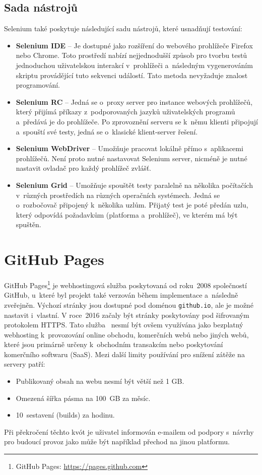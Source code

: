 \subsection*{Sada nástrojů}
Selenium také poskytuje následující sadu nástrojů, které usnadňují testování:
\begin{itemize}
    \item \textbf{Selenium IDE} -- Je dostupné jako rozšíření do webového prohlížeče Firefox nebo Chrome. Toto prostředí nabízí nejjednodušší způsob pro tvorbu testů jednoduchou uživatelskou interakcí v~prohlížeči a~následným vygenerováním skriptu provádějící tuto sekvenci událostí. Tato metoda nevyžaduje znalost programování.
    \item \textbf{Selenium RC} -- Jedná se o~proxy server pro instance webových prohlížečů, který přijímá příkazy z~podporovaných jazyků uživatelských programů a~předává je do prohlížeče. Po zprovoznění serveru se k~němu klienti připojují a~spouští své testy, jedná se o~klasické klient-server řešení.
    \item \textbf{Selenium WebDriver} -- Umožňuje pracovat lokálně přímo s~aplikacemi prohlížečů. Není proto nutné nastavovat Selenium server, nicméně je nutné nastavit ovladač pro každý prohlížeč zvlášť.
    \item \textbf{Selenium Grid} -- Umožňuje \cite{website:Selenium} spouštět testy paralelně na několika počítačích v~různých prostředích na různých operačních systémech. Jedná se o~rozbočovač připojený k~několika uzlům. Přijatý test je poté předán uzlu, který odpovídá požadavkům (platforma a~prohlížeč), ve kterém má být spuštěn.
\end{itemize}

\section{GitHub Pages}
\label{sec:GitHub Pages}
GitHub Pages\footnote{GitHub Pages: \url{https://pages.github.com}} je webhostingová služba poskytovaná od roku~2008 společností GitHub, u~které byl projekt také verzován během implementace a~následně zveřejněn. Výchozí stránky jsou dostupné pod doménou \texttt{github.io}, ale je možné nastavit i~vlastní. V roce~2016 začaly být stránky poskytovány pod šifrovaným protokolem HTTPS. Tato služba~\cite{website:ghpages} nesmí být ovšem využívána jako bezplatný webhosting k~provozování online obchodu, komerčních webů nebo jiných webů, které jsou primárně určeny k~obchodním transakcím nebo poskytování komerčního softwaru (SaaS). Mezi další limity používání pro snížení zátěže na servery patří:
\begin{itemize}
    \item Publikovaný obsah na webu nesmí být větší než 1 GB.
    \item Omezená šířka pásma na 100~GB za měsíc.
    \item 10~sestavení (builds) za hodinu.
\end{itemize}
Při překročení těchto kvót je uživatel informován e-mailem od podpory s~návrhy pro budoucí provoz jako může být například přechod na jinou platformu.

